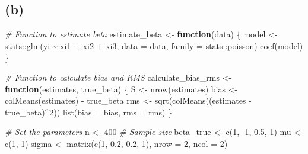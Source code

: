 \documentclass[
]{article}
\newenvironment{Shaded}{\begin{snugshade}}{\end{snugshade}}
\newcommand{\AttributeTok}[1]{\textcolor[rgb]{0.77,0.63,0.00}{#1}}
\newcommand{\CommentTok}[1]{\textcolor[rgb]{0.56,0.35,0.01}{\textit{#1}}}
\newcommand{\ControlFlowTok}[1]{\textcolor[rgb]{0.13,0.29,0.53}{\textbf{#1}}}
\newcommand{\DecValTok}[1]{\textcolor[rgb]{0.00,0.00,0.81}{#1}}
\newcommand{\FloatTok}[1]{\textcolor[rgb]{0.00,0.00,0.81}{#1}}
\newcommand{\FunctionTok}[1]{\textcolor[rgb]{0.00,0.00,0.00}{#1}}
\newcommand{\NormalTok}[1]{#1}
\newcommand{\OtherTok}[1]{\textcolor[rgb]{0.56,0.35,0.01}{#1}}
\newcommand{\SpecialCharTok}[1]{\textcolor[rgb]{0.00,0.00,0.00}{#1}}
\begin{document}
\hypertarget{b}{%
\subsection{(b)}\label{b}}

\begin{Shaded}
\begin{Highlighting}[]
\CommentTok{\# Function to estimate beta}
\NormalTok{estimate\_beta }\OtherTok{\textless{}{-}} \ControlFlowTok{function}\NormalTok{(data) \{}
\NormalTok{  model }\OtherTok{\textless{}{-}}\NormalTok{ stats}\SpecialCharTok{::}\FunctionTok{glm}\NormalTok{(yi }\SpecialCharTok{\textasciitilde{}}\NormalTok{ xi1 }\SpecialCharTok{+}\NormalTok{ xi2 }\SpecialCharTok{+}\NormalTok{ xi3, }\AttributeTok{data =}\NormalTok{ data, }\AttributeTok{family =}\NormalTok{ stats}\SpecialCharTok{::}\NormalTok{poisson)}
  \FunctionTok{coef}\NormalTok{(model)}
\NormalTok{\}}

\CommentTok{\# Function to calculate bias and RMS}
\NormalTok{calculate\_bias\_rms }\OtherTok{\textless{}{-}} \ControlFlowTok{function}\NormalTok{(estimates, true\_beta) \{}
\NormalTok{  S }\OtherTok{\textless{}{-}} \FunctionTok{nrow}\NormalTok{(estimates)}
\NormalTok{  bias }\OtherTok{\textless{}{-}} \FunctionTok{colMeans}\NormalTok{(estimates) }\SpecialCharTok{{-}}\NormalTok{ true\_beta}
\NormalTok{  rms }\OtherTok{\textless{}{-}} \FunctionTok{sqrt}\NormalTok{(}\FunctionTok{colMeans}\NormalTok{((estimates }\SpecialCharTok{{-}}\NormalTok{ true\_beta)}\SpecialCharTok{\^{}}\DecValTok{2}\NormalTok{))}
  \FunctionTok{list}\NormalTok{(}\AttributeTok{bias =}\NormalTok{ bias, }\AttributeTok{rms =}\NormalTok{ rms)}
\NormalTok{\}}

\CommentTok{\# Set the parameters}
\NormalTok{n }\OtherTok{\textless{}{-}} \DecValTok{400}  \CommentTok{\# Sample size}
\NormalTok{beta\_true }\OtherTok{\textless{}{-}} \FunctionTok{c}\NormalTok{(}\DecValTok{1}\NormalTok{, }\SpecialCharTok{{-}}\DecValTok{1}\NormalTok{, }\FloatTok{0.5}\NormalTok{, }\DecValTok{1}\NormalTok{)}
\NormalTok{mu }\OtherTok{\textless{}{-}} \FunctionTok{c}\NormalTok{(}\DecValTok{1}\NormalTok{, }\DecValTok{1}\NormalTok{)}
\NormalTok{sigma }\OtherTok{\textless{}{-}} \FunctionTok{matrix}\NormalTok{(}\FunctionTok{c}\NormalTok{(}\DecValTok{1}\NormalTok{, }\FloatTok{0.2}\NormalTok{, }\FloatTok{0.2}\NormalTok{, }\DecValTok{1}\NormalTok{), }\AttributeTok{nrow =} \DecValTok{2}\NormalTok{, }\AttributeTok{ncol =} \DecValTok{2}\NormalTok{)}
\end{Highlighting}
\end{Shaded}
\end{document}
